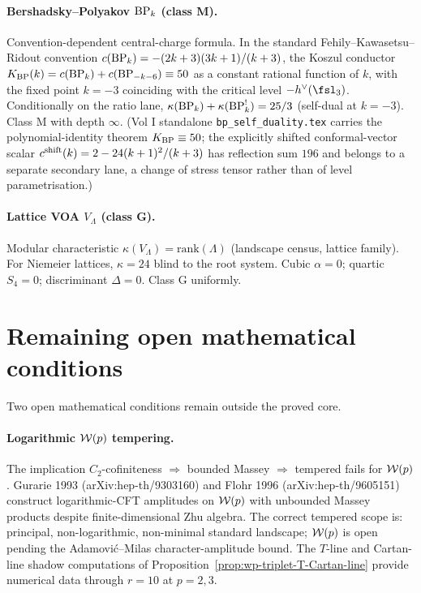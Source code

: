 \paragraph{Bershadsky--Polyakov $\mathrm{BP}_k$ (class M).}
Convention-dependent central-charge formula. In the standard
Fehily--Kawasetsu--Ridout convention
$c(\mathrm{BP}_k) = -(2 k + 3)(3 k + 1)/(k + 3)$, the Koszul
conductor $K_{\mathrm{BP}}(k) = c(\mathrm{BP}_k) + c(\mathrm{BP}_{-k - 6}) \equiv 50$ as a
constant rational function of $k$, with the fixed point $k = -3$
coinciding with the critical level $-\hv(\fsl_3)$.
Conditionally on the ratio lane,
$\kappa(\mathrm{BP}_k) + \kappa(\mathrm{BP}_k^{!}) = 25/3$ (self-dual at $k = -3$).
Class M with depth $\infty$. (Vol I standalone
\texttt{bp\_self\_duality.tex} carries the polynomial-identity
theorem $K_{\mathrm{BP}}\equiv 50$; the explicitly shifted conformal-vector
scalar $c^{\rm shift}(k) = 2 - 24(k+1)^2/(k+3)$ has reflection
sum $196$ and belongs to a separate secondary lane, a change of
stress tensor rather than of level parametrisation.)

\paragraph{Lattice VOA $V_\Lambda$ (class G).}
Modular characteristic $\kappa(V_\Lambda) = \mathrm{rank}(\Lambda)$
(landscape census, lattice family). For Niemeier lattices,
$\kappa = 24$ blind to the root system. Cubic $\alpha = 0$; quartic
$S_4 = 0$; discriminant $\Delta = 0$. Class G uniformly.

\section{Remaining open mathematical conditions}
\label{sec:open-frontier}

Two open mathematical conditions remain outside the proved core.

\paragraph{Logarithmic $\mathcal{W}(p)$ tempering.}
The implication
$C_2$-cofiniteness $\Rightarrow$ bounded Massey $\Rightarrow$
tempered fails for $\mathcal{W}(p)$. Gurarie 1993 (arXiv:hep-th/9303160)
and Flohr 1996 (arXiv:hep-th/9605151) construct logarithmic-CFT
amplitudes on $\mathcal{W}(p)$ with unbounded Massey products despite
finite-dimensional Zhu algebra. The correct tempered scope is:
principal, non-logarithmic, non-minimal standard landscape; $\mathcal{W}(p)$
is open pending the Adamovi\'c--Milas character-amplitude bound. The
$T$-line and Cartan-line shadow computations of
Proposition~\ref{prop:wp-triplet-T-Cartan-line} provide numerical
data through $r = 10$ at $p = 2, 3$.

